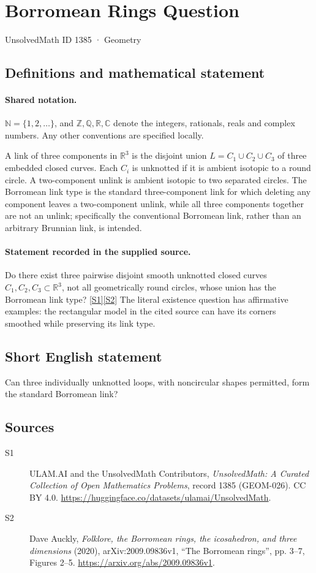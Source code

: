 \documentclass[11pt]{article}
\newcommand{\sref}[2]{\hyperlink{source:#1:#2}{[S#2]}}
\begin{document}
\setcounter{section}{1384}
\section{Borromean Rings Question}\label{1385}
{\small\sffamily UnsolvedMath ID 1385 · Geometry}
\subsection{Definitions and mathematical statement}

\paragraph{Shared notation.}$\mathbb N=\{1,2,\ldots\}$, and $\mathbb Z,\mathbb Q,\mathbb R,\mathbb C$ denote the integers, rationals, reals and complex numbers. Any other conventions are specified locally.


A link of three components in $\mathbb R^3$ is the disjoint union $L=C_1\cup C_2\cup C_3$ of three embedded closed curves. Each $C_i$ is unknotted if it is ambient isotopic to a round circle. A two-component unlink is ambient isotopic to two separated circles. The Borromean link type is the standard three-component link for which deleting any component leaves a two-component unlink, while all three components together are not an unlink; specifically the conventional Borromean link, rather than an arbitrary Brunnian link, is intended.
\paragraph{Statement recorded in the supplied source.}
Do there exist three pairwise disjoint smooth unknotted closed curves $C_1,C_2,C_3\subset\mathbb R^3$, not all geometrically round circles, whose union has the Borromean link type? \sref{1385}{1}\sref{1385}{2}
The literal existence question has affirmative examples: the rectangular model in the cited source can have its corners smoothed while preserving its link type.
\subsection{Short English statement}
Can three individually unknotted loops, with noncircular shapes permitted, form the standard Borromean link?
\subsection{Sources}
\begin{description}
\item[\hypertarget{source:1385:1}{S1}] ULAM.AI and the UnsolvedMath Contributors, \emph{UnsolvedMath: A Curated Collection of Open Mathematics Problems}, record 1385 (GEOM-026). CC BY 4.0. \url{https://huggingface.co/datasets/ulamai/UnsolvedMath}.
\item[\hypertarget{source:1385:2}{S2}] Dave Auckly, \emph{Folklore, the Borromean rings, the icosahedron, and three dimensions} (2020), arXiv:2009.09836v1, ``The Borromean rings'', pp. 3--7, Figures 2--5. \url{https://arxiv.org/abs/2009.09836v1}.
\end{description}
\label{end:1385}
\end{document}
